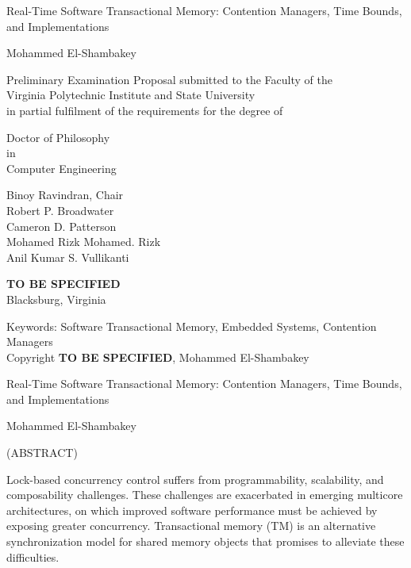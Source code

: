 \documentclass[12pt,english]{report}
\begin{document}
\thispagestyle{empty}
\begin{center}

{\Large 
Real-Time Software Transactional Memory: Contention Managers, Time Bounds, and Implementations
}

\vfill

Mohammed El-Shambakey

\vfill

Preliminary Examination Proposal submitted to the Faculty of the \\
Virginia Polytechnic Institute and State University \\
in partial fulfilment of the requirements for the degree of

\vfill

Doctor of Philosophy \\
in \\
Computer Engineering

\vfill

Binoy Ravindran, Chair \\
Robert P. Broadwater \\
Cameron D. Patterson \\
Mohamed Rizk Mohamed. Rizk\\
Anil Kumar S. Vullikanti

\vfill

\textbf{TO BE SPECIFIED}\\
Blacksburg, Virginia

\vfill

Keywords: Software Transactional Memory, Embedded Systems, Contention Managers
\\
Copyright \textbf{TO BE SPECIFIED}, Mohammed El-Shambakey

\end{center}

\pagebreak

\thispagestyle{empty}
\begin{center}

{\large Real-Time Software Transactional Memory: Contention Managers, Time Bounds, and Implementations}

\vfill

Mohammed El-Shambakey

\vfill

(ABSTRACT)

\vfill

\end{center}

Lock-based concurrency control suffers from programmability, scalability, and composability  challenges. These challenges are exacerbated in emerging multicore architectures, on which improved software performance must be achieved by exposing greater concurrency.   Transactional memory (TM) is an alternative synchronization model for shared memory objects that promises to alleviate these difficulties. 
\end{document}
